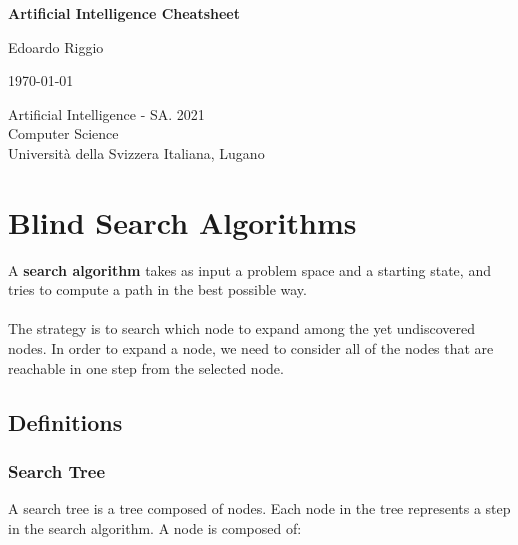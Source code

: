 \documentclass{article}
\begin{document}
\begin{titlepage}
    \begin{center}
        \vspace*{1cm}
        
        \Huge
        \textbf{Artificial Intelligence Cheatsheet}
        
        \vspace{0.5cm}
        \LARGE
        
        \vspace{.5cm}
        
        Edoardo Riggio
   		  \vspace{1.5cm}
       
        \vfill
        
        \today
        
        \vspace{.8cm}
          \Large
          Artificial Intelligence - SA. 2021 \\
        Computer Science\\
        Universit\`{a} della Svizzera Italiana, Lugano\\
        
    \end{center}
\end{titlepage}

\tableofcontents

\newpage

\section{Blind Search Algorithms}
A \textbf{search algorithm} takes as input a problem space and a starting state, and tries to compute a path in the best possible way. \\ \\
The strategy is to search which node to expand among the yet undiscovered nodes. In order to expand a node, we need to consider all of the nodes that are reachable in one step from the selected node.

\subsection{Definitions}
\subsubsection{Search Tree}
A search tree is a tree composed of nodes. Each node in the tree represents a step in the search algorithm. A node is composed of:
\end{document}
